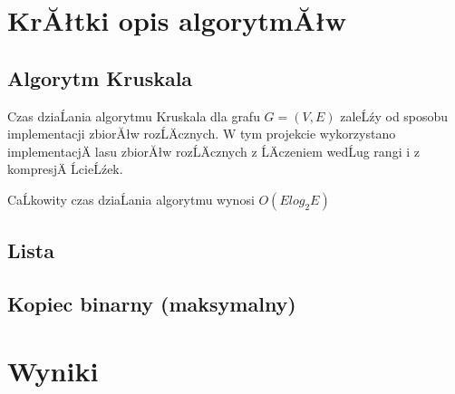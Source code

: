 \documentclass[a4paper, 11pt]{article}
\begin{document}
	
	\section{KrĂłtki opis algorytmĂłw} 
	\label{sec:ops_struktur}
	
	\subsection{Algorytm Kruskala}
	\label{subsec:tablica}

	Czas dziaĹania algorytmu Kruskala dla grafu $G=(V,E)$ zaleĹźy od sposobu implementacji zbiorĂłw rozĹÄcznych. W tym projekcie wykorzystano implementacjÄ lasu zbiorĂłw rozĹÄcznych z ĹÄczeniem wedĹug rangi i z kompresjÄ ĹcieĹźek.
	
	CaĹkowity czas dziaĹania algorytmu wynosi $O(Elog_2E)$

	\subsection{Lista}
	\label{subsec:lista}
	
	\subsection{Kopiec binarny (maksymalny)}
	\label{sec:kopiec}
	
	
	\section{Wyniki}
	
\end{document}
